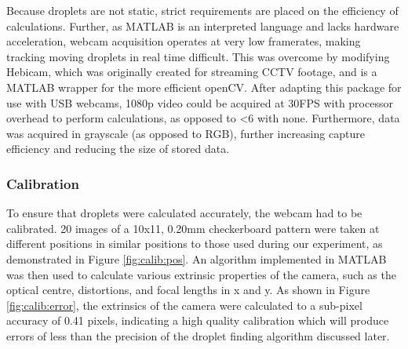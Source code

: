 \documentclass{physics_article_B}
\begin{document}
    Because droplets are not static, strict requirements are placed on the efficiency of calculations. Further, as MATLAB is an interpreted language and lacks hardware acceleration, webcam acquisition operates at very low framerates, making tracking moving droplets in real time difficult. This was overcome by modifying Hebicam\cite{HebiCam}, which was originally created for streaming CCTV footage, and is a MATLAB wrapper for the more efficient openCV. After adapting this package for use with USB webcams, 1080p video could be acquired at 30FPS with processor overhead to perform calculations, as opposed to <6 with none. Furthermore, data was acquired in grayscale (as opposed to RGB), further increasing capture efficiency and reducing the size of stored data. 
    
    \subsubsection{Calibration}
    
    To ensure that droplets were calculated accurately, the webcam had to be calibrated. 20 images of a 10x11, 0.20mm checkerboard pattern were taken at different positions in similar positions to those used during our experiment, as demonstrated in Figure \ref{fig:calib:pos}. An algorithm implemented in MATLAB\cite{CameraCalib} was then used to calculate various extrinsic properties of the camera, such as the optical centre, distortions, and focal lengths in x and y. As shown in Figure \ref{fig:calib:error}, the extrinsics of the camera were calculated to a sub-pixel accuracy of 0.41 pixels, indicating a high quality calibration which will produce errors of less than the precision of the droplet finding algorithm discussed later. \\
    
\end{document}
